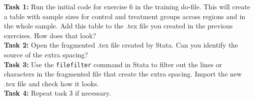 \documentclass[12pts]{report}
\begin{document}
\textbf{Task 1:} Run the initial code for exercise 6 in the training do-file. This will create a table with sample sizes for control and treatment groups across regions and in the whole sample. Add this table to the .tex file you created in the previous exercises. How does that look?\\

\textbf{Task 2:} Open the fragmented .tex file created by Stata. Can you identify the source of the extra spacing?\\

\textbf{Task 3:} Use the \texttt{filefilter} command in Stata to filter out the lines or characters in the fragmented file that create the extra spacing. Import the new .tex file and check how it looks.\\

\textbf{Task 4:} Repeat task 3 if necessary.
\end{document}
